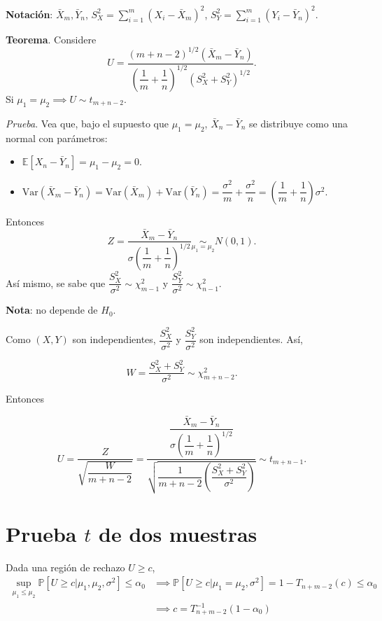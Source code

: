 \documentclass[
  12pt,
]{book}
\begin{document}
\textbf{Notación}: \(\bar X_m,\bar Y_n\), \(S_X^2 = \sum_{i=1}^m(X_i-\bar X_m)^2\), \(S_Y^2 = \sum_{i=1}^m(Y_i-\bar Y_n)^2\).

\textbf{Teorema}. Considere
\[U = \dfrac{(m+n-2)^{1/2}(\bar X_m-\bar Y_n)}{\left(\dfrac 1m+\dfrac 1n\right)^{1/2}(S_X^2+S_Y^2)^{1/2}}.\]
Si \(\mu_1=\mu_2 \implies U\sim t_{m+n-2}.\)

\emph{Prueba}. Vea que, bajo el supuesto que \(\mu_1=\mu_2\), \(\bar X_n-\bar Y_n\) se distribuye como una normal con parámetros:

\begin{itemize}
\item
  \(\mathbb E[X_n-\bar Y_n] = \mu_1-\mu_2 =0\).
\item
  \(\text{Var}(\bar X_m-\bar Y_n) =\text{Var}(\bar X_m) + \text{Var}(\bar Y_n) = \dfrac{\sigma^2}m + \dfrac{\sigma^2}n =\left(\dfrac 1m+\dfrac 1n\right)\sigma^2\).
\end{itemize}

Entonces
\[Z = \dfrac{\bar X_m-\bar Y_n}{\sigma\left(\dfrac 1m+\dfrac 1n\right)^{1/2}}\underset{\mu_1 =\mu_2}{\sim} N(0,1).\]
Así mismo, se sabe que \(\dfrac{S_X^2}{\sigma^2}\sim \chi^2_{m-1}\) y \(\dfrac{S_Y^2}{\sigma^2}\sim \chi^2_{n-1}\).

\textbf{Nota}: no depende de \(H_0\).

Como \((X,Y)\) son independientes, \(\dfrac{S_X^2}{\sigma^2}\) y \(\dfrac{S_Y^2}{\sigma^2}\) son independientes. Así,

\[W = \dfrac{S_X^2+S_Y^2}{\sigma^2} \sim \chi^2_{m+n-2}.\]

Entonces

\[U = \dfrac{Z}{\sqrt{\dfrac W{m+n-2}}}=\dfrac{\dfrac{\bar X_m-\bar Y_n}{\sigma\left(\dfrac 1m+\dfrac 1n\right)^{1/2}}}{\sqrt{\dfrac 1{m+n-2}\left(\dfrac{S_X^2+S_Y^2}{\sigma^2}\right)}}\sim t_{m+n-1}.\]

\hypertarget{prueba-t-de-dos-muestras}{%
\section{\texorpdfstring{Prueba \(t\) de dos muestras}{Prueba t de dos muestras}}\label{prueba-t-de-dos-muestras}}

Dada una región de rechazo \(U\geq c\),
\begin{align*}
\sup_{\mu_1\leq \mu_2}\mathbb P[U\geq c|\mu_1,\mu_2,\sigma^2]\leq \alpha_0 & \implies \mathbb P[U\geq c|\mu_1=\mu_2,\sigma^2] = 1-T_{n+m-2}(c) \leq \alpha_0 \\
& \implies c = T_{n+m-2}^{-1}(1-\alpha_0)
\end{align*}
\end{document}
